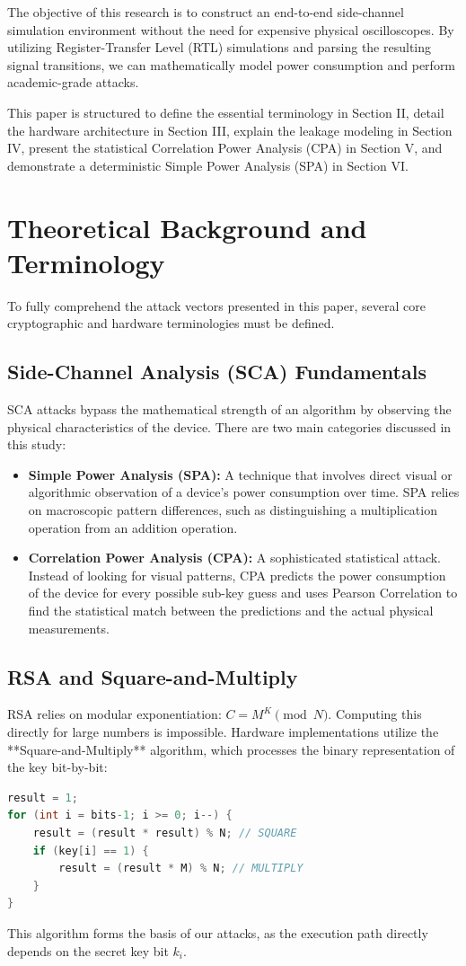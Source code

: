 \documentclass[conference, a4paper]{IEEEtran}
\begin{document}
The objective of this research is to construct an end-to-end side-channel simulation environment without the need for expensive physical oscilloscopes. By utilizing Register-Transfer Level (RTL) simulations and parsing the resulting signal transitions, we can mathematically model power consumption and perform academic-grade attacks. 

This paper is structured to define the essential terminology in Section II, detail the hardware architecture in Section III, explain the leakage modeling in Section IV, present the statistical Correlation Power Analysis (CPA) in Section V, and demonstrate a deterministic Simple Power Analysis (SPA) in Section VI.

\section{Theoretical Background and Terminology}
To fully comprehend the attack vectors presented in this paper, several core cryptographic and hardware terminologies must be defined.

\subsection{Side-Channel Analysis (SCA) Fundamentals}
SCA attacks bypass the mathematical strength of an algorithm by observing the physical characteristics of the device. There are two main categories discussed in this study:
\begin{itemize}
    \item \textbf{Simple Power Analysis (SPA):} A technique that involves direct visual or algorithmic observation of a device's power consumption over time. SPA relies on macroscopic pattern differences, such as distinguishing a multiplication operation from an addition operation.
    \item \textbf{Correlation Power Analysis (CPA):} A sophisticated statistical attack. Instead of looking for visual patterns, CPA predicts the power consumption of the device for every possible sub-key guess and uses Pearson Correlation to find the statistical match between the predictions and the actual physical measurements.
\end{itemize}

\subsection{RSA and Square-and-Multiply}
RSA relies on modular exponentiation: $C = M^K \pmod N$. Computing this directly for large numbers is impossible. Hardware implementations utilize the **Square-and-Multiply** algorithm, which processes the binary representation of the key bit-by-bit:
\begin{lstlisting}[language=C]
result = 1;
for (int i = bits-1; i >= 0; i--) {
    result = (result * result) % N; // SQUARE
    if (key[i] == 1) {
        result = (result * M) % N; // MULTIPLY
    }
}
\end{lstlisting}
This algorithm forms the basis of our attacks, as the execution path directly depends on the secret key bit $k_i$.
\end{document}
